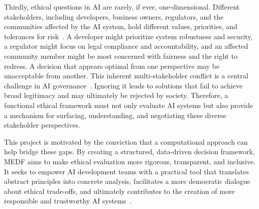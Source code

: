 Thirdly, ethical questions in AI are rarely, if ever, one-dimensional. Different stakeholders, including developers, business owners, regulators, and the communities affected by the AI system, hold different values, priorities, and tolerances for risk~\cite{freeman1984stakeholder}. A developer might prioritize system robustness and security, a regulator might focus on legal compliance and accountability, and an affected community member might be most concerned with fairness and the right to redress. A decision that appears optimal from one perspective may be unacceptable from another. This inherent multi-stakeholder conflict is a central challenge in AI governance~\cite{mitchell1997stakeholder}. Ignoring it leads to solutions that fail to achieve broad legitimacy and may ultimately be rejected by society. Therefore, a functional ethical framework must not only evaluate AI systems but also provide a mechanism for surfacing, understanding, and negotiating these diverse stakeholder perspectives.

This project is motivated by the conviction that a computational approach can help bridge these gaps. By creating a structured, data-driven decision framework, MEDF aims to make ethical evaluation more rigorous, transparent, and inclusive. It seeks to empower AI development teams with a practical tool that translates abstract principles into concrete analysis, facilitates a more democratic dialogue about ethical trade-offs, and ultimately contributes to the creation of more responsible and trustworthy AI systems~\cite{taddeo2018ai,dignum2019responsible}.
